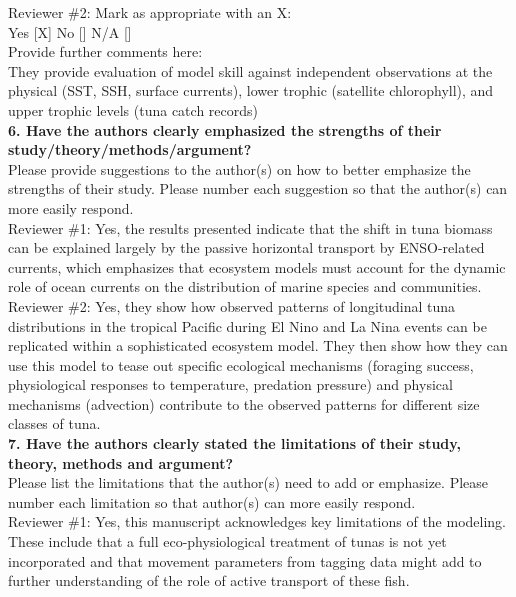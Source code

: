 \documentclass{article}
\begin{document}
Reviewer \#2: Mark as appropriate with an X:\\
Yes [X] No [] N/A []\\

Provide further comments here:\\ 

They provide evaluation of model skill against independent observations at the physical (SST, SSH, surface currents), lower trophic (satellite chlorophyll), and upper trophic levels (tuna catch records) \\

\textbf{6. Have the authors clearly emphasized the strengths of their study/theory/methods/argument?}\\

Please provide suggestions to the author(s) on how to better emphasize the strengths of their study. Please number each suggestion so that the author(s) can more easily respond. \\

Reviewer \#1: Yes, the results presented indicate that the shift in tuna biomass can be explained largely by the passive horizontal transport by ENSO-related currents, which emphasizes that ecosystem models must account for the dynamic role of ocean currents on the distribution of marine species and communities.\\

Reviewer \#2: Yes, they show how observed patterns of longitudinal tuna distributions in the tropical Pacific during El Nino and La Nina events can be replicated within a sophisticated ecosystem model. They then show how they can use this model to tease out specific ecological mechanisms (foraging success, physiological responses to temperature, predation pressure) and physical mechanisms (advection) contribute to the observed patterns for different size classes of tuna.\\

\textbf{7. Have the authors clearly stated the limitations of their study, theory, methods and argument?}\\

Please list the limitations that the author(s) need to add or emphasize. Please number each limitation so that author(s) can more easily respond.\\

Reviewer \#1: Yes, this manuscript acknowledges key limitations of the modeling. These include that a full eco-physiological treatment of tunas is not yet incorporated and that movement parameters from tagging data might add to further understanding of the role of active transport of these fish.\\
\end{document}
